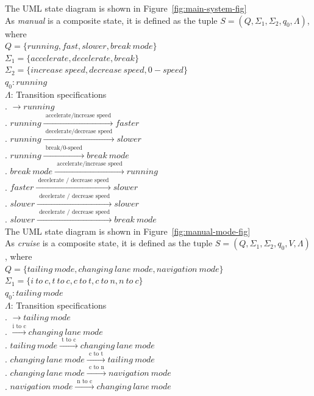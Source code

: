 \documentclass[12pt]{article}
\begin{document}
\begin{spacing}{1.5}
\noindent The UML state diagram is shown in Figure~\ref{fig:main-system-fig}\\


\noindent As \textit{manual} is a composite state, it is defined as the tuple $S = (Q, \Sigma_1, \Sigma_2, q_0, \Lambda)$, where\\

\noindent $Q = \{running, fast, slower, break~mode\}$\\
\noindent $\Sigma_1 = \{accelerate, decelerate, break\}$\\
\noindent $\Sigma_2 = \{increase~speed, decrease~speed, 0-speed\}$\\
\noindent $q_0: running$\\
\noindent $\Lambda$: Transition specifications\\
. $\rightarrow running$\\
. $running \xrightarrow {\text { accelerate/increase speed }} faster$\\
. $running \xrightarrow {\text { decelerate/decrease speed }} slower$\\
. $running \xrightarrow {\text { break/0-speed }} break~mode$\\
. $break~mode \xrightarrow {\text { accelerate/increase speed }} running$\\
. $faster \xrightarrow {\text { decelerate / decrease speed }} slower$\\
. $slower \xrightarrow {\text { decelerate / decrease speed }} slower$\\
. $slower \xrightarrow {\text { decelerate / decrease speed }} break~mode$\\

\noindent The UML state diagram is shown in Figure~\ref{fig:manual-mode-fig}\\


\noindent As \textit{cruise} is a composite state, it is defined as the tuple $S = (Q, \Sigma_1, \Sigma_2, q_0, V, \Lambda)$, where\\

\noindent $Q = \{tailing~mode, changing~lane~mode, navigation~mode\}$\\
\noindent $\Sigma_1 = \{i~to~c, t~to~c, c~to~t, c~to~n, n~to~c\}$\\
\noindent $q_0: tailing~mode$\\
\noindent $\Lambda$: Transition specifications\\
. $\rightarrow tailing~mode$\\
. $\xrightarrow {\text{i to c}} changing~lane~mode$\\
. $tailing~mode \xrightarrow {\text { t to c }} changing~lane~mode$\\
. $changing~lane~mode \xrightarrow {\text { c to t }} tailing~mode$\\
. $changing~lane~mode \xrightarrow {\text { c to n }} navigation~mode$\\
. $navigation~mode \xrightarrow {\text { n to c }} changing~lane~mode$\\


\end{spacing}
\end{document}
